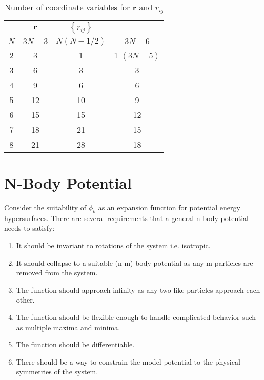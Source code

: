 \documentclass[12pt,thmsa]{article}
\begin{document}
\begin{table}[tbp] \centering%
\begin{tabular}{cccc}
\hline\hline
& $\mathbf{r}$ & $\left\{ r_{ij}\right\} $ &  \\ 
$N$ & $3N-3$ & $N\left( N-1/2\right) $ & $3N-6$ \\ \hline
2 & 3 & 1 & 1$\,\,(3N-5)$ \\ 
3 & 6 & 3 & 3 \\ 
4 & 9 & 6 & 6 \\ 
5 & 12 & 10 & 9 \\ 
6 & 15 & 15 & 12 \\ 
7 & 18 & 21 & 15 \\ 
8 & 21 & 28 & 18 \\ \hline
\end{tabular}
\caption{Number of coordinate variables for {\bf{r}} and $ r_{ij} $
\label{Ntab}}%
\end{table}%

\section{N-Body Potential}

Consider the suitability of $\phi _k$ as an expansion function for potential
energy hypersurfaces. There are several requirements that a general n-body
potential needs to satisfy:

\begin{enumerate}
\item  It should be invariant to rotations of the system i.e. isotropic.

\item  It should collapse to a suitable (n-m)-body potential as any m
particles are removed from the system.

\item  The function should approach infinity as any two like particles
approach each other.

\item  The function should be flexible enough to handle complicated behavior
such as multiple maxima and minima.

\item  The function should be differentiable.

\item  There should be a way to constrain the model potential to the
physical symmetries of the system.
\end{enumerate}
\end{document}
